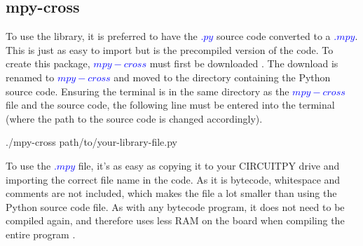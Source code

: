 \subsection{mpy-cross}

To use the library, it is preferred to have the \textcolor{blue}{$.py$} source code converted to a \textcolor{blue}{$.mpy$}. This is just as easy to import but is the precompiled version of the code. To create this package, \textcolor{blue}{$mpy-cross$} must first be downloaded \cite{libraryFileTypes} \cite{mpycrossDownloads}. The download is renamed to \textcolor{blue}{$mpy-cross$} and moved to the directory containing the Python source code. Ensuring the terminal is in the same directory as the \textcolor{blue}{$mpy-cross$} file and the source code, the following line must be entered into the terminal (where the path to the source code is changed accordingly).

\begin{python}
    ./mpy-cross path/to/your-library-file.py
\end{python}

To use the \textcolor{blue}{$.mpy$} file, it's as easy as copying it to your CIRCUITPY drive and importing the correct file name in the code. As it is bytecode, whitespace and comments are not included, which makes the file a lot smaller than using the Python source code file. As with any bytecode program, it does not need to be compiled again, and therefore uses less RAM on the board when compiling the entire program \cite{libraryFileTypes}.
